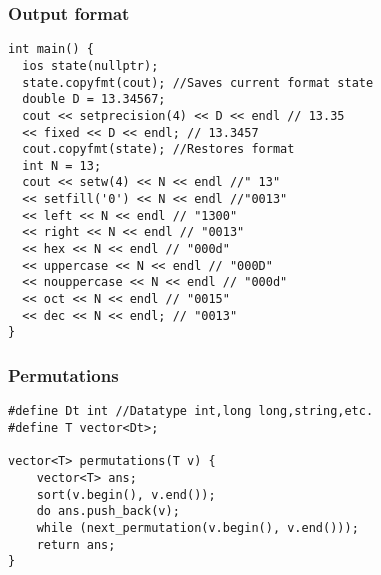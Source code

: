 \documentclass[twoside]{article}
\begin{document}
\begin{multicols*}{2}
\begin{verbatim}
\end{verbatim}

{
\subsubsection*{Output format}
}
\begin{verbatim}
int main() {
  ios state(nullptr);
  state.copyfmt(cout); //Saves current format state
  double D = 13.34567;
  cout << setprecision(4) << D << endl // 13.35
  << fixed << D << endl; // 13.3457
  cout.copyfmt(state); //Restores format
  int N = 13;
  cout << setw(4) << N << endl //" 13"
  << setfill('0') << N << endl //"0013"
  << left << N << endl // "1300"
  << right << N << endl // "0013"
  << hex << N << endl // "000d"
  << uppercase << N << endl // "000D"
  << nouppercase << N << endl // "000d"
  << oct << N << endl // "0015"
  << dec << N << endl; // "0013"
}

\end{verbatim}

{
\subsubsection*{Permutations}
}
\begin{verbatim}
#define Dt int //Datatype int,long long,string,etc.
#define T vector<Dt>;

vector<T> permutations(T v) {
	vector<T> ans;
	sort(v.begin(), v.end());
	do ans.push_back(v);
	while (next_permutation(v.begin(), v.end()));
	return ans;
}

\end{verbatim}

{
}
\end{multicols*}
\end{document}
